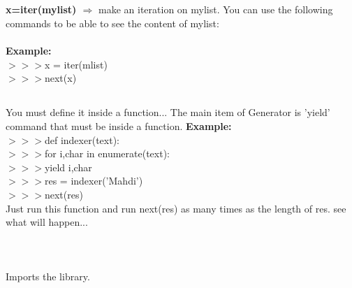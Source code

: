 \documentclass[a4paper,18pt]{article}
\begin{document}
\subsection{\colorbox {matgreen}{\color{white}{\large Iterator}}}
\textbf{x=iter(mylist) $\Rightarrow$} make an iteration on mylist. You can use the following commands to be able to see the content of mylist:\\\\
\textbf{Example:\\}
$>>>$x = iter(mlist)\\

$>>>$next(x)\\


\subsection{\colorbox {matgreen}{\color{white}{\large Python Generator}}}
You must define it inside a function... The main item of Generator is 'yield' command that must be inside a function.
\textbf{Example:\\}
$>>>$def indexer(text):\\

$>>>$\hspace*{14pt}for i,char in enumerate(text):\\

$>>>$\hspace*{28pt}yield i,char\\

$>>>$res = indexer('Mahdi')\\

$>>>$next(res)\\

Just run this function and run next(res) as many times as the length of res. see what will happen...\\\\
\newpage

\section{\colorbox {Abi}{}}
\subsection{\colorbox {matgreen}{\color{white}{\large import glob}}}
Imports the library.\\\\
\end{document}
